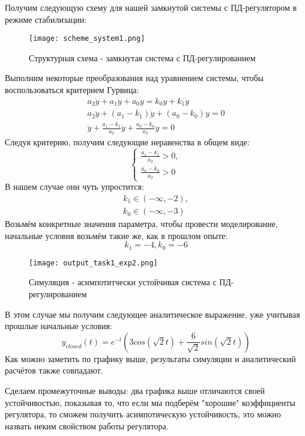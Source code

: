 Получим следующую схему для нашей замкнутой системы с ПД-регулятором в режиме стабилизации:
\begin{figure}[ht]
  \centering
  \texttt{[image: scheme\_system1.png]}
\caption{Структурная схема - замкнутая система с ПД-регулированием}
\end{figure}

Выполним некоторые преобразования над уравнением системы, чтобы воспользоваться критерием Гурвица:
$$
  \begin{aligned}
    a_2\ddot{y} + a_1\dot{y} + a_0y = k_0y + k_1\dot{y} \\
    a_2\ddot{y} + (a_1-k_1)\dot{y} + (a_0 - k_0)y = 0 \\
    \ddot{y} + \frac{a_1-k_1}{a_2}\dot{y} + \frac{a_0 - k_0}{a_2} y = 0
  \end{aligned}
$$
Следуя критерию, получим следующие неравенства в общем виде:
$$
\begin{cases}
  \frac{a_1-k_1}{a_2} > 0, \\
  \frac{a_0 - k_0}{a_2} > 0
\end{cases}
$$
В нашем случае они чуть упростится:
$$
\begin{aligned}
  k_1 \in (-\infty, -2), \\
  k_0 \in (-\infty, -3)
\end{aligned}
$$
Возьмём конкретные значения параметра, чтобы провести моделирование, начальные условия возьмём такие же, как в прошлом опыте:
$$
k_1 = -4, k_0 = -6
$$
\begin{figure}[ht]
  \centering
  \texttt{[image: output\_task1\_exp2.png]}
\caption{Симуляция - асимпотитчески устойчивая система с ПД-регулированием}
\end{figure}

В этом случае мы получим следующее аналитическое выражение, уже учитывая прошлые начальные условия:
$$
y_{closed}(t) = e^{-t}(3cos(\sqrt{2}t) + \frac{6}{\sqrt{2}}sin(\sqrt{2}t))
$$
Как можно заметить по графику выше, результаты симуляции и аналитический расчётов также совпадают.

Сделаем промежуточные выводы: два графика выше отличаются своей устойчивостью, показывая то, 
что если мы подберём "хорошие" коэффициенты регулятора, 
то сможем получить асимпотическую устойчивость, это можно назвать неким свойством работы регулятора.

\endinput